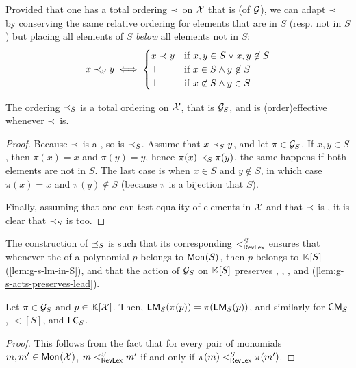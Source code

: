 \AP
Provided that one has a total ordering $\order$ on $\X$ that is 
 (of $\group$), we can adapt $\order$
by conserving the same relative ordering for elements that are in $S$
(resp. not in $S$) but placing all elements of $S$ \emph{below} all
elements not in $S$:
\begin{equation}
    x \sOrderLt y \iff 
    \begin{cases}
        x \order y & \text{if } x,y \in S \lor x,y \not\in S  \\
        \top       & \text{if } x \in S \land y \not \in S \\
        \bot       & \text{if } x \not\in S \land y \in S \\
    \end{cases}
\end{equation}

\begin{lemma}
    \label{lem:total-ordering}
    The ordering $\sOrderLt$ is a total ordering on $\X$,
    that is  $\group_S$,
    and is \kl(order){effective} whenever $\order$ is.
\end{lemma}
\begin{proof}
    Because $\order$ is a , 
    so is $\sOrderLt$. 
    Assume that $x \sOrderLt y$, and let $\pi \in \group_S$.
    If $x,y \in S$, then $\pi(x) = x$ and $\pi(y) = y$, hence
    $\pi(x) \sOrderLt \pi(y)$, the same happens if
    both elements are not in $S$. The last case is when
    $x \in S$ and $y \not \in S$, in which case $\pi(x) = x$
    and $\pi(y) \not \in S$ (because $\pi$ is a bijection that  $S$).

    Finally,
    assuming that one can test equality of elements in $\X$ and that
    $\order$ is , it is clear that $\sOrderLt$ is 
    too.
\end{proof}

\AP The construction of $\sOrderLeq$ is such that its corresponding
 $\revlex[S]$ ensures that whenever the  of a polynomial $p$ belongs to $\mon{S}$, then $p$ belongs to
$\poly{\K}{S}$ (\cref{lem:g-s-lm-in-S}), and that the action of $\group_S$ on
$\poly{\K}{S}$ preserves , ,
, and 
(\cref{lem:g-s-acts-preserves-lead}).

\begin{lemma}
    \label{lem:g-s-acts-preserves-lead}
    Let $\pi \in \group_S$ and $p \in \poly{\K}{\X}$.
    Then, $\lm[S](\pi(p)) = \pi(\lm[S](p))$,
    and similarly for $\cm[S]$, $\lt[S]$, and $\lc[S]$.
\end{lemma}
\begin{proof}
    This follows from the fact that for every pair of monomials
    $m,m' \in \mon{\X}$,
    $m \revlex[S] m'$ if and only if $\pi(m) \revlex[S] \pi(m')$.
\end{proof}

